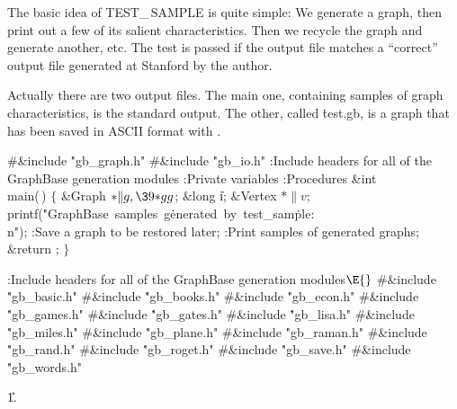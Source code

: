 The basic idea of {\sc TEST\_\,SAMPLE} is quite simple: We generate a graph,
then print out a few of its salient characteristics. Then we recycle
the graph and generate another, etc. The test is passed if the output
file matches a ``correct'' output file generated at Stanford by the author.

Actually there are two output files. The main one, containing samples of
graph characteristics, is the standard output. The other, called \.{test.gb},
is a graph that has been saved in ASCII format with .

\Y\B\8\#\&{include} \.{"gb\_graph.h"}\6
\8\#\&{include} \.{"gb\_io.h"}\6
:Include headers for all of the GraphBase generation modules\X\7
:Private variables\X\6
:Procedures\X\7
\1\1\hbox{\4}\&{int} \\{main}(\,)\2\2\6
${}\{{}$\5
\1\&{Graph} ${}{*}\|g,\39{*}\\{gg}{}$;\5
\&{long} \|i;\5
\&{Vertex} ${}{*}\|v{}$;\7
\\{printf}(\.{"GraphBase\ samples\ g}\)\.{enerated\ by\ test\_sam}\)\.{ple:%
\\n"});\6
:Save a graph to be restored later\X;\6
:Print samples of generated graphs\X;\6
\&{return} ;\6
\4${}\}{}$\2\par
\fi

\B{}:Include headers for all of the GraphBase generation modules\X${}%
\E{}$\6
\8\#\&{include} \.{"gb\_basic.h"}\6
\8\#\&{include} \.{"gb\_books.h"}\6
\8\#\&{include} \.{"gb\_econ.h"}\6
\8\#\&{include} \.{"gb\_games.h"}\6
\8\#\&{include} \.{"gb\_gates.h"}\6
\8\#\&{include} \.{"gb\_lisa.h"}\6
\8\#\&{include} \.{"gb\_miles.h"}\6
\8\#\&{include} \.{"gb\_plane.h"}\6
\8\#\&{include} \.{"gb\_raman.h"}\6
\8\#\&{include} \.{"gb\_rand.h"}\6
\8\#\&{include} \.{"gb\_roget.h"}\6
\8\#\&{include} \.{"gb\_save.h"}\6
\8\#\&{include} \.{"gb\_words.h"}%
\par
\U1.\fi


